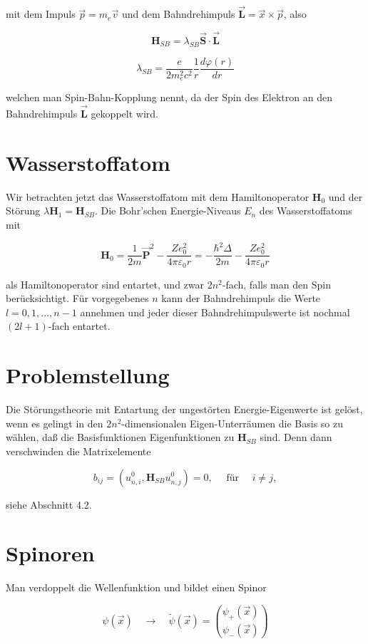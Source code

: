 \documentclass[10pt, letterpaper]{article}
\begin{document}
mit dem Impuls $\vec{p}=m_{e} \vec{v}$ und dem Bahndrehimpuls $\overrightarrow{\mathbf{L}}=\vec{x} \times \vec{p}$, also

$$
\mathbf{H}_{S B}=\lambda_{S B} \overrightarrow{\mathbf{S}} \cdot \overrightarrow{\mathbf{L}}
$$

$$
\lambda_{S B}=\frac{e}{2 m_{e}^{2} c^{2}} \frac{1}{r} \frac{d \varphi(r)}{d r}
$$

welchen man Spin-Bahn-Kopplung nennt, da der Spin des Elektron an den Bahndrehimpuls $\overrightarrow{\mathbf{L}}$ gekoppelt wird.

\section*{Wasserstoffatom}
Wir betrachten jetzt das Wasserstoffatom mit dem Hamiltonoperator $\mathbf{H}_{0}$ und der Störung $\lambda \mathbf{H}_{1}=\mathbf{H}_{S B}$. Die Bohr'schen Energie-Niveaus $E_{n}$ des Wasserstoffatoms mit

$$
\mathbf{H}_{0}=\frac{1}{2 m} \overrightarrow{\mathbf{P}}^{2}-\frac{Z e_{0}^{2}}{4 \pi \varepsilon_{0} r}=-\frac{\hbar^{2} \Delta}{2 m}-\frac{Z e_{0}^{2}}{4 \pi \varepsilon_{0} r}
$$

als Hamiltonoperator sind entartet, und zwar $2 n^{2}$-fach, falls man den Spin berücksichtigt. Für vorgegebenes $n$ kann der Bahndrehimpuls die Werte $l=0,1, \ldots, n-1$ annehmen und jeder dieser Bahndrehimpulswerte ist nochmal $(2 l+1)$-fach entartet.

\section*{Problemstellung}
Die Störungstheorie mit Entartung der ungestörten Energie-Eigenwerte ist gelöst, wenn es gelingt in den $2 n^{2}$-dimensionalen Eigen-Unterräumen die Basis so zu wählen, daß die Basisfunktionen Eigenfunktionen zu $\mathbf{H}_{S B}$ sind. Denn dann verschwinden die Matrixelemente

$$
b_{i j}=\left(u_{n, i}^{0}, \mathbf{H}_{S B} u_{n, j}^{0}\right)=0, \quad \text { für } \quad i \neq j,
$$

siehe Abschnitt 4.2.

\section*{Spinoren}
Man verdoppelt die Wellenfunktion und bildet einen Spinor

$$
\psi(\vec{x}) \quad \rightarrow \quad \tilde{\psi}(\vec{x})=\binom{\psi_{+}(\vec{x})}{\psi_{-}(\vec{x})}
$$
\end{document}
